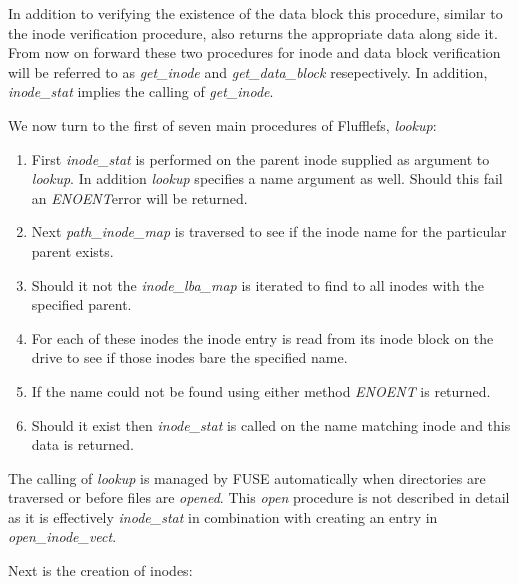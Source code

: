 In addition to verifying the existence of the data block this procedure, similar
to the inode verification procedure, also returns the appropriate data along
side it. From now on forward these two procedures for inode and data block
verification will be referred to as \textit{get\_inode} and
\textit{get\_data\_block} resepectively. In addition, \textit{inode\_stat}
implies the calling of \textit{get\_inode}.

We now turn to the first of seven main procedures of Flufflefs, \textit{lookup}:
\begin{enumerate}
    \item First \textit{inode\_stat} is performed on the parent inode supplied
    as argument to \textit{lookup}. In addition \textit{lookup} specifies a name
    argument as well. Should this fail an \textit{ENOENT}\footnotemark[14] error
    will be returned.
    \item Next \textit{path\_inode\_map} is traversed to see if the inode name
    for the particular parent exists.
    \item Should it not the \textit{inode\_lba\_map} is iterated to find to
    all inodes with the specified parent.
    \item For each of these inodes the inode entry is read from its inode block
    on the drive to see if those inodes bare the specified name.
    \item If the name could not be found using either method \textit{ENOENT}
    is returned.
    \item Should it exist then \textit{inode\_stat} is called on the name
    matching inode and this data is returned.
\end{enumerate}


The calling of \textit{lookup} is managed by FUSE automatically when directories
are traversed or before files are \textit{opened}. This \textit{open} procedure
is not described in detail as it is effectively \textit{inode\_stat} in
combination with creating an entry in \textit{open\_inode\_vect}.

Next is the creation of inodes:

